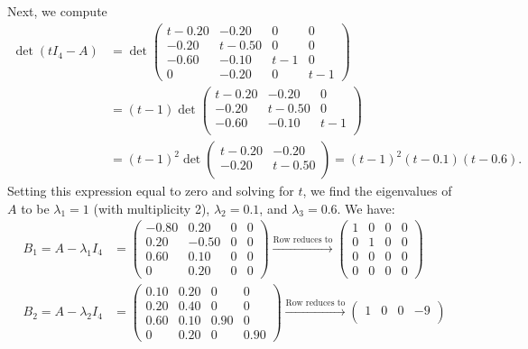 \documentclass[12pt]{article}
\begin{document}
\begin{enumerate}
Next, we compute
\begin{align*}
\det(tI_4 - A) &= \det\begin{pmatrix}
t - 0.20 & -0.20 & 0 & 0 \\
-0.20 & t - 0.50 & 0 & 0 \\
-0.60 & -0.10 & t - 1 & 0 \\
0 & -0.20 & 0 & t - 1
\end{pmatrix} \\
&= (t - 1) \det\begin{pmatrix}
t - 0.20 & -0.20 & 0 \\
-0.20 & t - 0.50 & 0 \\
-0.60 & -0.10 & t - 1 \\
\end{pmatrix} \\
&= (t - 1)^2 \det\begin{pmatrix}
t - 0.20 & -0.20 \\
-0.20 & t - 0.50 \\
\end{pmatrix} = (t - 1)^2(t - 0.1)(t - 0.6).
\end{align*}
Setting this expression equal to zero and solving for $t$, we find the eigenvalues of $A$ to be $\lambda_1 = 1$ (with multiplicity 2), $\lambda_2 = 0.1$, and $\lambda_3 = 0.6$. We have:
\begin{align*}
B_1 = A - \lambda_1 I_4 &= \begin{pmatrix}
-0.80 & 0.20 & 0 & 0 \\
0.20 & -0.50 & 0 & 0 \\
0.60 & 0.10 & 0 & 0 \\
0 & 0.20 & 0 & 0
\end{pmatrix}
\xrightarrow{\text{Row reduces to}}
\begin{pmatrix}
1 & 0 & 0 & 0 \\
0 & 1 & 0 & 0 \\
0 & 0 & 0 & 0 \\
0 & 0 & 0 & 0
\end{pmatrix} \\
B_2 = A - \lambda_2 I_4 &= \begin{pmatrix}
0.10 & 0.20 & 0 & 0 \\
0.20 & 0.40 & 0 & 0 \\
0.60 & 0.10 & 0.90 & 0 \\
0 & 0.20 & 0 & 0.90
\end{pmatrix}
\xrightarrow{\text{Row reduces to}}
\begin{pmatrix}
1 & 0 & 0 & -9 \\

\end{pmatrix}
\end{align*}
\end{enumerate}
\end{document}
